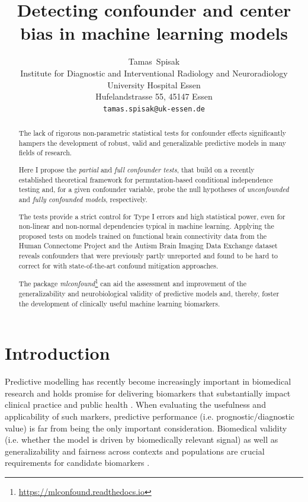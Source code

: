 \documentclass{article}
\title{Detecting confounder and center bias in machine learning models}
\author{
  Tamas~Spisak \\
  Institute for Diagnostic and Interventional Radiology and Neuroradiology \\
  University Hospital Essen\\
  Hufelandstrasse 55, 45147 Essen \\
  \texttt{tamas.spisak@uk-essen.de} \\
}
\begin{document}
\maketitle

\begin{abstract} %
The lack of rigorous non-parametric statistical tests for confounder effects significantly hampers the development of robust, valid and generalizable predictive models in many fields of research.

Here I propose the \emph{partial} and \emph{full confounder tests}, that build on a recently established theoretical framework for permutation-based conditional independence testing and, for a given confounder variable, probe the null hypotheses of \emph{unconfounded} and \emph{fully confounded models}, respectively.

The tests provide a strict control for Type I errors and high statistical power, even for non-linear and non-normal dependencies typical in machine learning.
Applying the proposed tests on models trained on functional brain connectivity data from the Human Connectome Project and the Autism Brain Imaging Data Exchange dataset reveals confounders that were previously partly unreported and found to be hard to correct for with state-of-the-art confound mitigation approaches.

The package \emph{mlconfound}\footnote{\href{https://mlconfound.readthedocs.io}{https://mlconfound.readthedocs.io}} can aid the assessment and improvement of the generalizability and neurobiological validity of predictive models and, thereby, foster the development of clinically useful machine learning biomarkers.
\end{abstract}



\section{Introduction}

Predictive modelling has recently become increasingly important in biomedical research and holds promise for delivering biomarkers that substantially impact clinical practice and public health \citep{kent2018personalized, spisak2020pain, walsh2021dome}. When evaluating the usefulness and applicability of such markers, predictive performance (i.e. prognostic/diagnostic value) is far from being the only important consideration. Biomedical validity (i.e. whether the model is driven by biomedically relevant signal) as well as generalizability and fairness across contexts and populations are crucial requirements for candidate biomarkers \citep{woo2017building, obermeyer2019dissecting, mehrabi2021survey}.
\end{document}
